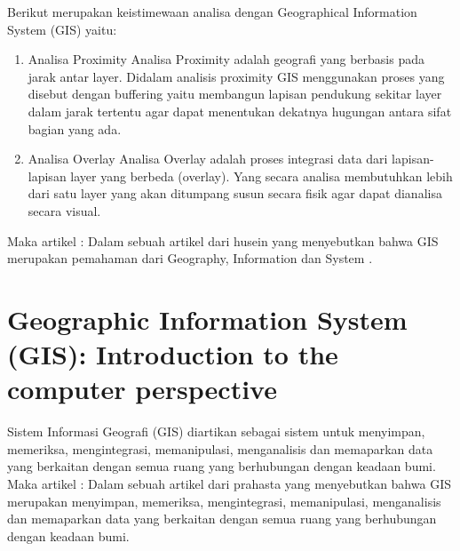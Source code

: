 Berikut merupakan keistimewaan analisa dengan Geographical Information System (GIS) yaitu:
\begin{enumerate}
\item Analisa Proximity
Analisa Proximity adalah geografi yang berbasis pada jarak antar layer.
Didalam analisis proximity GIS menggunakan proses yang disebut dengan buffering
yaitu membangun lapisan pendukung sekitar layer dalam jarak tertentu agar dapat menentukan
dekatnya hugungan antara sifat bagian yang ada.
\item Analisa Overlay
Analisa Overlay adalah proses integrasi data dari lapisan-lapisan layer yang berbeda (overlay).
Yang secara analisa membutuhkan lebih dari satu layer yang akan ditumpang susun secara
fisik agar dapat dianalisa secara visual.
\end{enumerate}

Maka artikel :
	Dalam sebuah artikel dari husein yang menyebutkan bahwa  GIS merupakan pemahaman dari
	Geography, Information dan System \cite{husein2006konsep}.

\section{Geographic Information System (GIS): Introduction to the computer perspective}
Sistem Informasi Geografi (GIS) diartikan sebagai sistem untuk menyimpan, memeriksa, 
mengintegrasi, memanipulasi, menganalisis dan memaparkan data yang berkaitan dengan semua 
ruang yang berhubungan dengan keadaan bumi.
Maka artikel :
	Dalam sebuah artikel dari prahasta yang menyebutkan bahwa  GIS merupakan menyimpan, memeriksa, mengintegrasi, memanipulasi, menganalisis dan memaparkan data yang berkaitan dengan semua ruang yang berhubungan dengan keadaan bumi\cite{prahasta2009sistem}.


